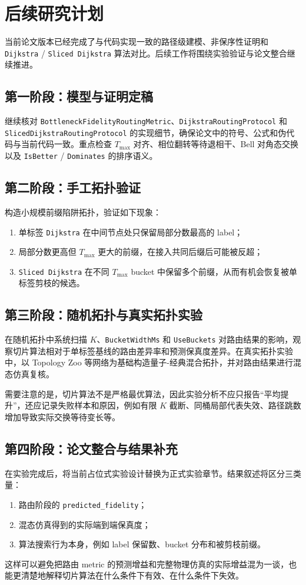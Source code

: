 
\chapter{后续研究计划}

当前论文版本已经完成了与代码实现一致的路径级建模、非保序性证明和 \texttt{Dijkstra} / \texttt{Sliced Dijkstra} 算法对比。后续工作将围绕实验验证与论文整合继续推进。

\section{第一阶段：模型与证明定稿}

继续核对 \texttt{BottleneckFidelityRoutingMetric}、\texttt{DijkstraRoutingProtocol} 和 \texttt{SlicedDijkstraRoutingProtocol} 的实现细节，确保论文中的符号、公式和伪代码与当前代码一致。重点检查 $T_{\max}$ 对齐、相位翻转等待退相干、Bell 对角态交换以及 \texttt{IsBetter} / \texttt{Dominates} 的排序语义。

\section{第二阶段：手工拓扑验证}

构造小规模前缀陷阱拓扑，验证如下现象：

\begin{enumerate}
  \item 单标签 \texttt{Dijkstra} 在中间节点处只保留局部分数最高的 label；
  \item 局部分数更高但 $T_{\max}$ 更大的前缀，在接入共同后缀后可能被反超；
  \item \texttt{Sliced Dijkstra} 在不同 $T_{\max}$ bucket 中保留多个前缀，从而有机会恢复被单标签剪枝的候选。
\end{enumerate}

\section{第三阶段：随机拓扑与真实拓扑实验}

在随机拓扑中系统扫描 $K$、\texttt{BucketWidthMs} 和 \texttt{UseBuckets} 对路由结果的影响，观察切片算法相对于单标签基线的路由差异率和预测保真度差异。在真实拓扑实验中，以 Topology Zoo 等网络为基础构造量子-经典混合拓扑，并对路由结果进行混态仿真复核。

需要注意的是，切片算法不是严格最优算法，因此实验分析不应只报告“平均提升”，还应记录失败样本和原因，例如有限 $K$ 截断、同桶局部代表失效、路径跳数增加导致实际交换等待变长等。

\section{第四阶段：论文整合与结果补充}

在实验完成后，将当前占位式实验设计替换为正式实验章节。结果叙述将区分三类量：

\begin{enumerate}
  \item 路由阶段的 \texttt{predicted\_fidelity}；
  \item 混态仿真得到的实际端到端保真度；
  \item 算法搜索行为本身，例如 label 保留数、bucket 分布和被剪枝前缀。
\end{enumerate}

这样可以避免把路由 metric 的预测增益和完整物理仿真的实际增益混为一谈，也能更清楚地解释切片算法在什么条件下有效、在什么条件下失效。
